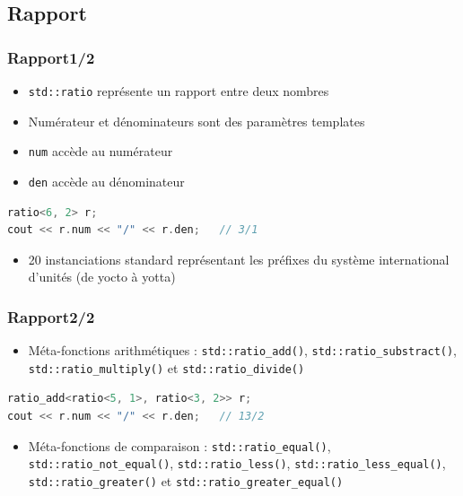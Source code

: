 \documentclass[C++.tex]{subfiles}
\begin{document}
\subsection*{Rapport}
\begin{frame}[fragile]
	\frametitle{Rapport\titlehfill{}1/2}


	\begin{itemize}
		\item \lstinline|std::ratio| représente un rapport entre deux nombres
		\item Numérateur et dénominateurs sont des paramètres templates
		\item \lstinline|num| accède au numérateur
		\item \lstinline|den| accède au dénominateur
	\end{itemize}

	\begin{lstlisting}[language=C++]
ratio<6, 2> r;
cout << r.num << "/" << r.den;   // 3/1\end{lstlisting}

	\begin{itemize}
		\item 20 instanciations standard représentant les préfixes du système international d'unités (de yocto à yotta)

	\end{itemize}
\end{frame}

\begin{frame}[fragile]
	\frametitle{Rapport\titlehfill{}2/2}
	\begin{itemize}
		\item Méta-fonctions arithmétiques : \lstinline|std::ratio_add()|, \lstinline|std::ratio_substract()|, \lstinline|std::ratio_multiply()| et \lstinline|std::ratio_divide()|

	\end{itemize}

	\begin{lstlisting}[language=C++]
ratio_add<ratio<5, 1>, ratio<3, 2>> r;
cout << r.num << "/" << r.den;   // 13/2\end{lstlisting}

	\begin{itemize}
		\item Méta-fonctions de comparaison : \lstinline|std::ratio_equal()|, \lstinline|std::ratio_not_equal()|, \lstinline|std::ratio_less()|, \lstinline|std::ratio_less_equal()|, \lstinline|std::ratio_greater()| et \lstinline|std::ratio_greater_equal()|
	\end{itemize}
\end{frame}
\end{document}
